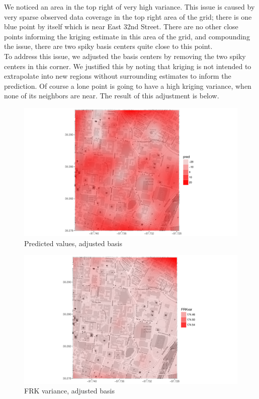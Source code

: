 \documentclass[11pt]{article}
\begin{document}
We noticed an area in the top right of very high variance.  This issue is caused by very sparse observed data coverage in the top right area of the grid; there is one blue point by itself which is near East 32nd Street.  There are no other close points informing the kriging estimate in this area of the grid, and compounding the issue, there are two spiky basis centers quite close to this point. \\

To address this issue, we adjusted the basis centers by removing the two spiky centers in this corner.  We justified this by noting that kriging is not intended to extrapolate into new regions without surrounding estimates to inform the prediction.  Of course a lone point is going to have a high kriging variance, when none of its neighbors are near. The result of this adjustment is below. \\

\begin{figure}[h!]
\centering
\includegraphics[width=160mm,keepaspectratio]{Images/pred_newgrid.pdf}
\caption{Predicted values, adjusted basis \label{fig:7}}
\end{figure}

\begin{figure}[h!]
\centering
\includegraphics[width=160mm,keepaspectratio]{Images/var_newgrid.pdf}
\caption{FRK variance, adjusted basis \label{fig:8}}
\end{figure}
\end{document}
